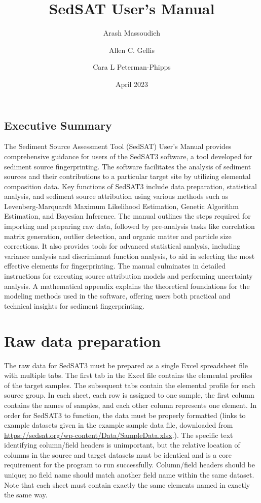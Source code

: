 \documentclass[12pt]{report}
\title{SedSAT User's Manual}
\author{Arash Massoudieh
    \and
    Allen C. Gellis
    \and
    Cara L Peterman-Phipps }
\date{April 2023}
\begin{document}
\maketitle

\section*{Executive Summary}
The Sediment Source Assessment Tool (SedSAT) User’s Manual provides comprehensive guidance for users of the SedSAT3 software, a tool developed for sediment source fingerprinting. The software facilitates the analysis of sediment sources and their contributions to a particular target site by utilizing elemental composition data. Key functions of SedSAT3 include data preparation, statistical analysis, and sediment source attribution using various methods such as Levenberg-Marquardt Maximum Likelihood Estimation, Genetic Algorithm Estimation, and Bayesian Inference. The manual outlines the steps required for importing and preparing raw data, followed by pre-analysis tasks like correlation matrix generation, outlier detection, and organic matter and particle size corrections. It also provides tools for advanced statistical analysis, including variance analysis and discriminant function analysis, to aid in selecting the most effective elements for fingerprinting. The manual culminates in detailed instructions for executing source attribution models and performing uncertainty analysis. A mathematical appendix explains the theoretical foundations for the modeling methods used in the software, offering users both practical and technical insights for sediment fingerprinting.
\tableofcontents




\chapter{Raw data preparation}
The raw data for SedSAT3 must be prepared as a single Excel spreadsheet file with multiple tabs. The first tab in the Excel file contains the elemental profiles of the target samples. The subsequent tabs contain the elemental profile for each source group. In each sheet, each row is assigned to one sample, the first column contains the names of samples, and each other column represents one element. In order for SedSAT3 to function, the data must be properly formatted (links to example datasets given in the example sample data file, downloaded from \url{https://sedsat.org/wp-content/Data/SampleData.xlsx}.). The specific text identifying column/field headers is unimportant, but the relative location of columns in the source and target datasets must be identical and is a core requirement for the program to run successfully. Column/field headers should be unique; no field name should match another field name within the same dataset. Note that each sheet must contain exactly the same elements named in exactly the same way. 
\end{document}
